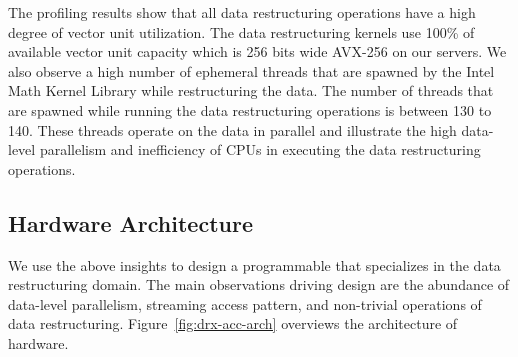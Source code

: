 
The profiling results show that all data restructuring operations have a high degree of vector unit utilization. The data restructuring kernels use 100\% of available vector unit capacity which is 256 bits wide AVX-256 on our servers. 
We also observe a high number of ephemeral threads that are spawned by the Intel Math Kernel Library while restructuring the data. The number of threads that are spawned while running the data restructuring operations is between 130 to 140. These threads operate on the data in parallel and illustrate the high data-level parallelism and inefficiency of CPUs in executing the data restructuring operations.

\subsection{\drx Hardware Architecture}
We use the above insights to design a programmable \drx that specializes in the data restructuring domain.
%
The main observations driving \drx design are the abundance of data-level parallelism, streaming access pattern, and non-trivial operations of data restructuring. Figure~\ref{fig:drx-acc-arch} overviews the architecture of \drx hardware.
%

